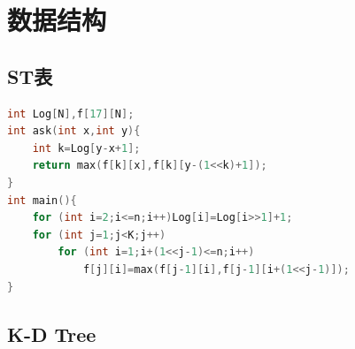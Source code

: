 \documentclass{article}
\begin{document}
\section{数据结构}
\subsection{ST表}
\begin{lstlisting}[language=C++]
int Log[N],f[17][N];
int ask(int x,int y){
	int k=Log[y-x+1];
	return max(f[k][x],f[k][y-(1<<k)+1]);
}
int main(){
	for (int i=2;i<=n;i++)Log[i]=Log[i>>1]+1;
	for (int j=1;j<K;j++)
		for (int i=1;i+(1<<j-1)<=n;i++)
			f[j][i]=max(f[j-1][i],f[j-1][i+(1<<j-1)]);
}
\end{lstlisting}

\subsection{K-D Tree}
\end{document}
